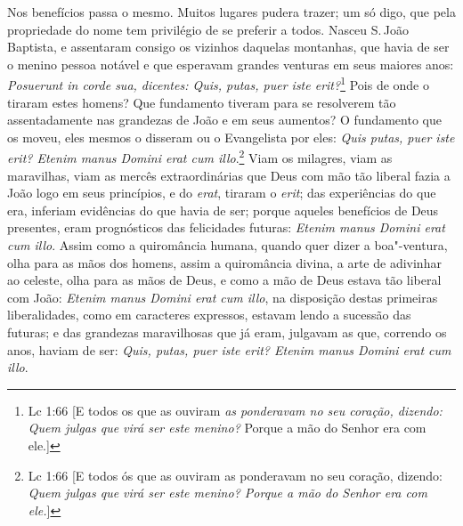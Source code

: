 Nos benefícios passa o mesmo. Muitos lugares pudera trazer; um só digo,
que pela propriedade do nome tem privilégio de se preferir a todos.
Nasceu S.\,João Baptista, e assentaram consigo os vizinhos daquelas
montanhas, que havia de ser o menino pessoa notável e que esperavam
grandes venturas em seus maiores anos: \emph{Posuerunt in corde sua,
dicentes: Quis, putas, puer iste erit?}\footnote{Lc 1:66 [E todos os que as ouviram \textit{as ponderavam no seu coração, dizendo: Quem julgas que virá ser este menino?} Porque a mão do Senhor era com ele.]} Pois de onde o tiraram estes
homens? Que fundamento tiveram para se resolverem tão assentadamente nas
grandezas de João e em seus aumentos? O fundamento que os moveu, eles
mesmos o disseram ou o Evangelista por eles: \emph{Quis putas, puer iste
erit? Etenim manus Domini erat cum illo}.\footnote{Lc 1:66 [E todos ós que as ouviram as ponderavam no seu coração, dizendo: \textit{Quem julgas que virá ser este menino? Porque a mão do Senhor era com ele.}]} Viam os milagres, viam as
maravilhas, viam as mercês extraordinárias que Deus com mão tão liberal
fazia a João logo em seus princípios, e do \emph{erat}, tiraram o
\emph{erit}; das experiências do que era, inferiam evidências do que
havia de ser; porque aqueles benefícios de Deus presentes, eram
prognósticos das felicidades futuras: \emph{Etenim manus Domini erat cum
illo}. Assim como a quiromância humana, quando quer dizer a boa"-ventura,
olha para as mãos dos homens, assim a quiromância divina, a arte de
adivinhar ao celeste, olha para as mãos de Deus, e como a mão de Deus
estava tão liberal com João: \emph{Etenim manus Domini erat cum illo},
na disposição destas primeiras liberalidades, como em caracteres
expressos, estavam lendo a sucessão das futuras; e das grandezas
maravilhosas que já eram,
julgavam as que, correndo os anos, haviam de ser: \emph{Quis, putas,
puer iste erit? Etenim manus Domini erat cum illo}.

